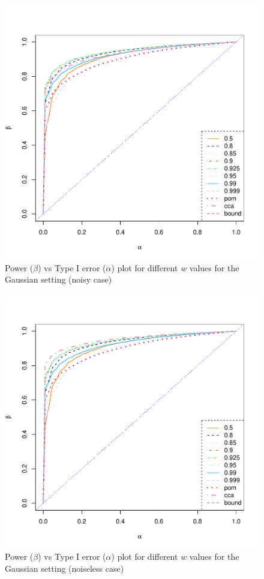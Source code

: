 \documentclass[11pt]{article} %
\begin{document}
\begin{figure}
\includegraphics[scale=0.35]{MVN-FC-Tradeoff-OOSc0-01-n150.pdf}
\caption{Power ($\beta$) vs Type I error ($\alpha$) plot for different $w$ values for the Gaussian setting (noisy case)}
\label{fig:MVN-c001-power-alpha}
\end{figure}

\begin{figure}
\includegraphics[scale=0.35]{MVN-FC-Tradeoff-OOSc0-n150.pdf}
\caption{Power ($\beta$) vs Type I error ($\alpha$) plot for different $w$ values for the Gaussian setting (noiseless case)}
\label{fig:MVN-c0-power-alpha}
\end{figure}
\end{document}
